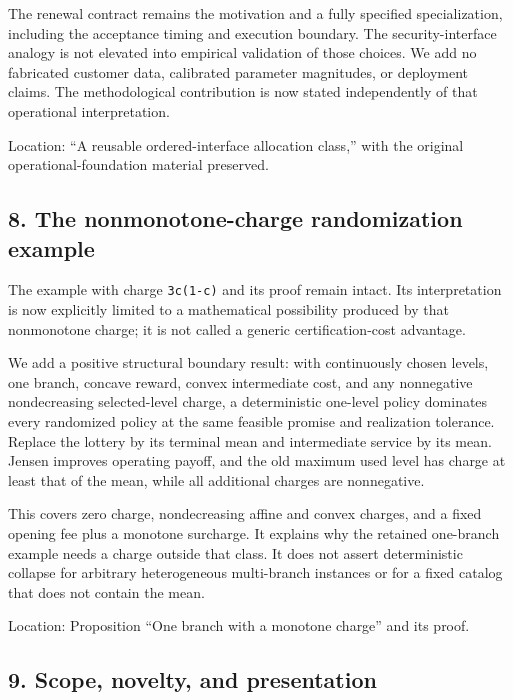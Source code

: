\documentclass[11pt,letterpaper]{article}
\begin{document}
The renewal contract remains the motivation and a fully specified specialization, including the acceptance timing and execution boundary. The security-interface analogy is not elevated into empirical validation of those choices. We add no fabricated customer data, calibrated parameter magnitudes, or deployment claims. The methodological contribution is now stated independently of that operational interpretation.



Location: “A reusable ordered-interface allocation class,” with the original operational-foundation material preserved.



\subsection*{8. The nonmonotone-charge randomization example}


The example with charge \nolinkurl{3c(1-c)} and its proof remain intact. Its interpretation is now explicitly limited to a mathematical possibility produced by that nonmonotone charge; it is not called a generic certification-cost advantage.



We add a positive structural boundary result: with continuously chosen levels, one branch, concave reward, convex intermediate cost, and any nonnegative nondecreasing selected-level charge, a deterministic one-level policy dominates every randomized policy at the same feasible promise and realization tolerance. Replace the lottery by its terminal mean and intermediate service by its mean. Jensen improves operating payoff, and the old maximum used level has charge at least that of the mean, while all additional charges are nonnegative.



This covers zero charge, nondecreasing affine and convex charges, and a fixed opening fee plus a monotone surcharge. It explains why the retained one-branch example needs a charge outside that class. It does not assert deterministic collapse for arbitrary heterogeneous multi-branch instances or for a fixed catalog that does not contain the mean.



Location: Proposition “One branch with a monotone charge” and its proof.



\subsection*{9. Scope, novelty, and presentation}
\end{document}
